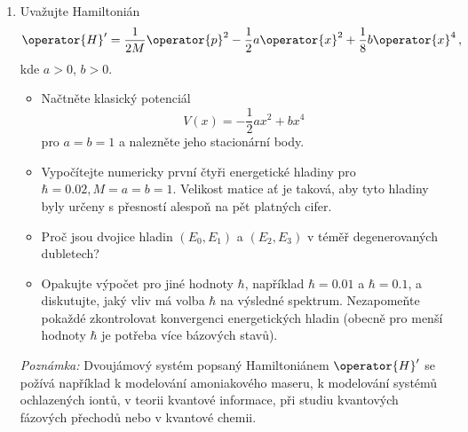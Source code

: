 \begin{enumerate}
    \item
        Uvažujte Hamiltonián
        \begin{equation}
            \label{eq:HamiltonianQuarticOscillator}
            \operator{H}'=\frac{1}{2M}\operator{p}^{2}-\frac{1}{2}a\operator{x}^{2}+\frac{1}{8}b\operator{x}^{4}\,,
        \end{equation}
        kde $a>0$, $b>0$.
        
        \begin{itemize}
        \item 
            Načtněte klasický potenciál
            \begin{equation}
                V(x)=-\frac{1}{2}ax^{2}+bx^{4}
            \end{equation}
            pro $a=b=1$ a nalezněte jeho stacionární body.
        \item 
            Vypočítejte numericky první čtyři energetické hladiny pro $\hbar=0.02,M=a=b=1$.
            Velikost matice ať je taková, aby tyto hladiny byly určeny s přesností alespoň na pět platných cifer.
        \item 
            Proč jsou dvojice hladin $(E_{0}, E_{1})$ a $(E_{2}, E_{3})$ v téměř degenerovaných dubletech?        
        \item 
            Opakujte výpočet pro jiné hodnoty $\hbar$, například $\hbar=0.01$ a $\hbar=0.1$, a diskutujte, jaký vliv má volba $\hbar$ na výsledné spektrum.
            Nezapomeňte pokaždé zkontrolovat konvergenci energetických hladin (obecně pro menší hodnoty $\hbar$ je potřeba více bázových stavů).
        \end{itemize}		
        
        \emph{Poznámka:} Dvoujámový systém popsaný Hamiltoniánem $\operator{H}'$ se požívá například k modelování amoniakového maseru, k modelování systémů ochlazených iontů, v teorii kvantové informace, při studiu kvantových fázových přechodů nebo v kvantové chemii.
            
    \end{enumerate}
